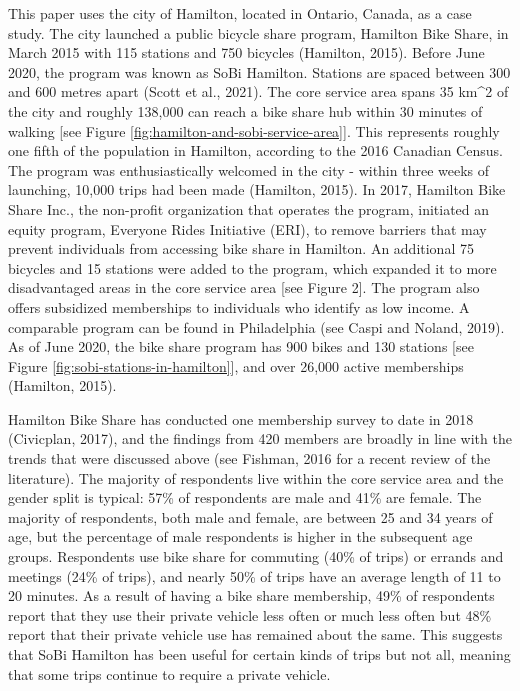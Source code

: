 \documentclass[]{elsarticle} %
\begin{document}
This paper uses the city of Hamilton, located in Ontario, Canada, as a
case study. The city launched a public bicycle share program, Hamilton
Bike Share, in March 2015 with 115 stations and 750 bicycles (Hamilton,
2015). Before June 2020, the program was known as SoBi Hamilton.
Stations are spaced between 300 and 600 metres apart (Scott et al.,
2021). The core service area spans 35 km\^{}2 of the city and roughly
138,000 can reach a bike share hub within 30 minutes of walking {[}see
Figure \ref{fig:hamilton-and-sobi-service-area}{]}. This represents
roughly one fifth of the population in Hamilton, according to the 2016
Canadian Census. The program was enthusiastically welcomed in the city -
within three weeks of launching, 10,000 trips had been made (Hamilton,
2015). In 2017, Hamilton Bike Share Inc., the non-profit organization
that operates the program, initiated an equity program, Everyone Rides
Initiative (ERI), to remove barriers that may prevent individuals from
accessing bike share in Hamilton. An additional 75 bicycles and 15
stations were added to the program, which expanded it to more
disadvantaged areas in the core service area {[}see Figure 2{]}. The
program also offers subsidized memberships to individuals who identify
as low income. A comparable program can be found in Philadelphia (see
Caspi and Noland, 2019). As of June 2020, the bike share program has 900
bikes and 130 stations {[}see Figure
\ref{fig:sobi-stations-in-hamilton}{]}, and over 26,000 active
memberships (Hamilton, 2015).

Hamilton Bike Share has conducted one membership survey to date in 2018
(Civicplan, 2017), and the findings from 420 members are broadly in line
with the trends that were discussed above (see Fishman, 2016 for a
recent review of the literature). The majority of respondents live
within the core service area and the gender split is typical: 57\% of
respondents are male and 41\% are female. The majority of respondents,
both male and female, are between 25 and 34 years of age, but the
percentage of male respondents is higher in the subsequent age groups.
Respondents use bike share for commuting (40\% of trips) or errands and
meetings (24\% of trips), and nearly 50\% of trips have an average
length of 11 to 20 minutes. As a result of having a bike share
membership, 49\% of respondents report that they use their private
vehicle less often or much less often but 48\% report that their private
vehicle use has remained about the same. This suggests that SoBi
Hamilton has been useful for certain kinds of trips but not all, meaning
that some trips continue to require a private vehicle.
\end{document}
